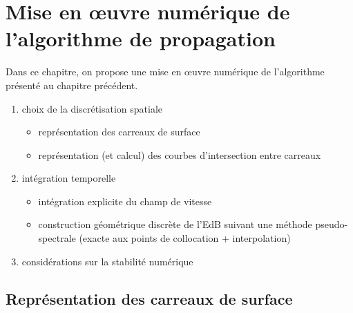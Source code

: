 \chapter{Mise en \oe uvre numérique de l'algorithme de propagation}
\label{chap:methode_numerique}

Dans ce chapitre, on propose une mise en \oe uvre numérique de l'algorithme présenté au chapitre précédent. 
\begin{enumerate}
	\item choix de la discrétisation spatiale
	\begin{itemize}
		\item représentation des carreaux de surface
		\item représentation (et calcul) des courbes d'intersection entre carreaux
	\end{itemize}
	\item intégration temporelle
	\begin{itemize}
		\item intégration explicite du champ de vitesse 
		\item construction géométrique discrète de l'EdB suivant une méthode pseudo-spectrale (exacte aux points de collocation + interpolation)
	\end{itemize}
	\item considérations sur la stabilité numérique
\end{enumerate}



\section{Représentation des carreaux de surface}
